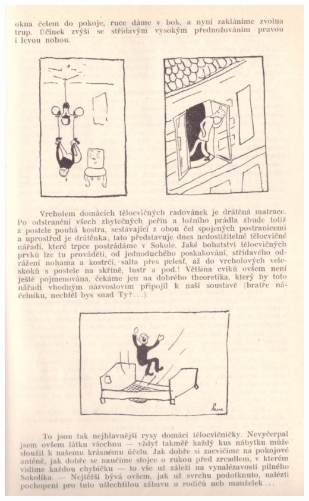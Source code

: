 \documentclass[11pt]{article}
\begin{document}
\includegraphics[width=\imagewidth]{original/1932/Skener_20250320 (8).jpg}
\end{document}

